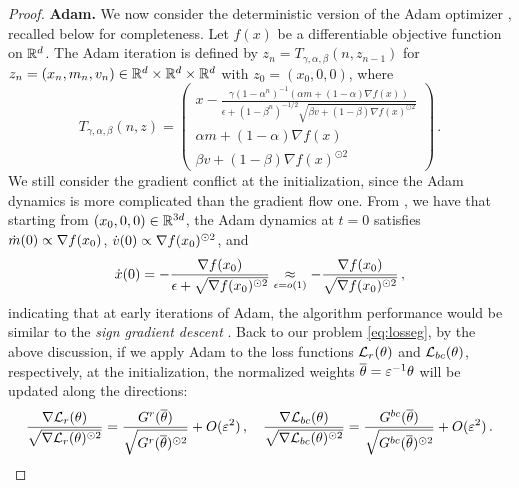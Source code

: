 \begin{proof}
\noindent 
{\bf Adam.} We now consider the deterministic version of the Adam optimizer \cite{kingma2014adam}, recalled below for completeness. Let $f(x)$ be a differentiable objective function on $\mathbb{R}^d$. The Adam iteration is defined by $z_n = T_{\gamma ,\alpha ,\beta}(n,z_{n - 1})$ 
for $z_n = (x_n, m_n,v_n) \in \mathbb{R}^d \times \mathbb{R}^d \times \mathbb{R}^d$ with $z_0 = (x_0, 0, 0)$, where 
\begin{equation*}
    T_{\gamma, \alpha, \beta}(n,z) = \begin{pmatrix}
        x - \frac{\gamma (1 - \alpha^n)^{- 1} ( \alpha m+ (1 - \alpha )\nabla f(x))}{\epsilon +(1 - \beta^n)^{- 1/2} \sqrt{\beta v+(1 - \beta )\nabla f(x)^{\odot 2}}} \\
        \alpha m+ (1 - \alpha )\nabla f(x) \\
        \beta v+ (1 - \beta )\nabla f(x)^{\odot 2}
        \end{pmatrix}\,.
\end{equation*}
We still consider the gradient conflict at the initialization, since the Adam dynamics is more complicated than the gradient flow one. From \cite{barakat2021convergence}, we have that starting from $(x_0,0,0) \in \mathbb{R}^{3d}$, the Adam dynamics at $t = 0$ satisfies $\dot{m}(0) \propto \nabla f(x_0)$, $\dot{v}(0) \propto \nabla f(x_0)^{\odot 2}$, and 
\begin{align*}
    \dot{x}(0) = - \frac{\nabla f(x_0)}{\epsilon + \sqrt{\nabla f(x_0)^{\odot 2}}} \underset{\epsilon = o(1)}{\approx}  - \frac{\nabla f(x_0)}{\sqrt{\nabla f(x_0)^{\odot 2}}}\,,
\end{align*}
indicating that at early iterations of Adam, 
the algorithm performance would be similar to the \emph{sign gradient
descent} \cite{balles2018dissecting}. Back to our problem \eqref{eq:losseg}, by the above discussion, if we apply Adam to the loss functions $\mathcal{L}_r(\theta)$ and $\mathcal{L}_{bc}(\theta)$, respectively, at the initialization, 
the normalized weights $\overline{\theta} = \varepsilon^{-1} \theta$ will be updated along the directions:
\begin{align*}
    \frac{\na \mc{L}_r(\theta)}{\sqrt{\na \mc{L}_r(\theta)^{\odot 2}}} = \frac{G^r(\wb{\theta})}{\sqrt{G^r(\wb{\theta})^{\odot 2}}} + O(\ep^2)\,, \q  \frac{\na \mc{L}_{bc}(\theta)}{\sqrt{\na \mc{L}_{bc}(\theta)^{\odot 2}}} = \frac{G^{bc}(\wb{\theta})}{\sqrt{G^{bc}(\wb{\theta})^{\odot 2}}} + O(\ep^2)\,.

\end{align*}
\end{proof}
